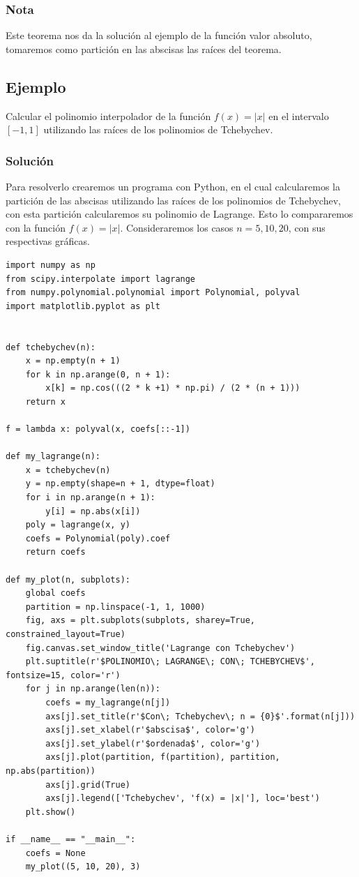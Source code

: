 \documentclass[12pt,a4paper,oneside]{scrbook}
\newcounter{ns}
\begin{document}
\subsubsection*{Nota}
Este teorema nos da la solución al ejemplo de la función valor absoluto, tomaremos como partición en las abscisas las raíces del teorema.
\subsection*{Ejemplo}
Calcular el polinomio interpolador de la función $f(x)=|x|$ en el intervalo $[-1,1]$ utilizando las raíces de los polinomios de Tchebychev.\newpage
\subsubsection*{Solución}
Para resolverlo crearemos un programa con Python, en el cual calcularemos la partición de las abscisas utilizando las raíces de los polinomios de Tchebychev, con esta partición calcularemos su polinomio de Lagrange. Esto lo compararemos con la función $f(x)=|x|$. Consideraremos los casos $n=5,10,20$, con sus respectivas gráficas.
\begin{lstlisting}[frame=none]
import numpy as np
from scipy.interpolate import lagrange
from numpy.polynomial.polynomial import Polynomial, polyval
import matplotlib.pyplot as plt


def tchebychev(n):
    x = np.empty(n + 1)
    for k in np.arange(0, n + 1):
        x[k] = np.cos(((2 * k +1) * np.pi) / (2 * (n + 1)))
    return x

f = lambda x: polyval(x, coefs[::-1])

def my_lagrange(n):
    x = tchebychev(n)
    y = np.empty(shape=n + 1, dtype=float)
    for i in np.arange(n + 1):
        y[i] = np.abs(x[i])
    poly = lagrange(x, y)
    coefs = Polynomial(poly).coef
    return coefs

def my_plot(n, subplots):
    global coefs
    partition = np.linspace(-1, 1, 1000)
    fig, axs = plt.subplots(subplots, sharey=True, constrained_layout=True)
    fig.canvas.set_window_title('Lagrange con Tchebychev')
    plt.suptitle(r'$POLINOMIO\; LAGRANGE\; CON\; TCHEBYCHEV$', fontsize=15, color='r')
    for j in np.arange(len(n)):
        coefs = my_lagrange(n[j])
        axs[j].set_title(r'$Con\; Tchebychev\; n = {0}$'.format(n[j]))
        axs[j].set_xlabel(r'$abscisa$', color='g')
        axs[j].set_ylabel(r'$ordenada$', color='g')
        axs[j].plot(partition, f(partition), partition, np.abs(partition))
        axs[j].grid(True)
        axs[j].legend(['Tchebychev', 'f(x) = |x|'], loc='best')
    plt.show()

if __name__ == "__main__":
    coefs = None
    my_plot((5, 10, 20), 3)
\end{lstlisting}
\end{document}
